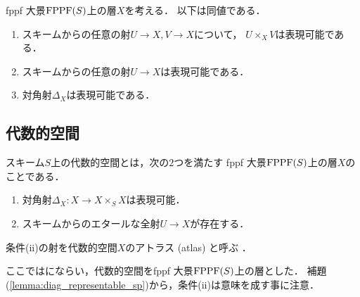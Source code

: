     \begin{Lemma}\label{lemma:diag_representable_sp}
        fppf 大景$\mathrm{FPPF}(S)$上の層$X$を考える．
        以下は同値である．
        \begin{enumerate}[label=(\roman*)]
            \item
                スキームからの任意の射$U \to X, V \to X$について，
                $U \times_{X} V$は表現可能である．
            \item スキームからの任意の射$U \to X$は表現可能である．
            \item 対角射$\Delta_{X}$は表現可能である．
        \end{enumerate}
    \end{Lemma}

\subsection{代数的空間}
    \begin{Def}
        スキーム$S$上の代数的空間とは，次の$2$つを満たす fppf 大景$\mathrm{FPPF}(S)$上の層$X$のことである．
        \begin{enumerate}[label=(\roman*)]
            \item 対角射$\Delta_{X} \colon X \to X \times_{S} X$は表現可能．
            \item スキームからのエタールな全射$U \to X$が存在する．
        \end{enumerate}
        条件(ii)の射を代数的空間$X$のアトラス (atlas) と呼ぶ
        ．
    \end{Def}
    ここでは\cite{SP}にならい，代数的空間をfppf 大景$\mathrm{FPPF}(S)$上の層とした．
    補題(\ref{lemma:diag_representable_sp})から，条件(ii)は意味を成す事に注意．

